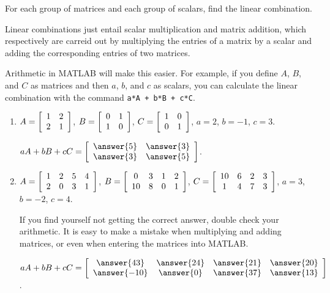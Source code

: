 \documentclass{ximera}
\author{Zack Reed}
\begin{document}
\begin{problem}

  For each group of matrices and each group of scalars, find the linear combination.

  \begin{hint}
  
    Linear combinations just entail scalar multiplication and matrix addition, which respectively are carreid out by multiplying the entries of a matrix by a scalar and adding the corresponding entries of two matrices.
    
    Arithmetic in MATLAB will make this easier. For example, if you define $A$, $B$, and $C$ as matrices and then $a$, $b$, and $c$ as scalars, you can calculate the linear combination with the command \texttt{a*A + b*B + c*C}.

  \end{hint}

  \begin{enumerate}
    \item
      $A = \startmat{cc}
        1 & 2 \\
        2 & 1
      \stopmat$,\quad
      $B = \startmat{cc}
        0 & 1 \\
        1 & 0
      \stopmat$,\quad
      $C = \startmat{cc}
        1 & 0 \\
        0 & 1
      \stopmat$,\quad
      $a = 2$, $b = -1$, $c = 3$.
  
      $aA + bB + cC = \startmat{cc}
        \answer{5} & \answer{3} \\
        \answer{3} & \answer{5}
      \stopmat$.
  
    \item 
      $A = \startmat{cccc}
        1 & 2 & 5 & 4 \\
        2 & 0 & 3 & 1
      \stopmat$,\quad
      $B = \startmat{cccc}
        0 & 3 & 1 & 2 \\
        10 & 8 & 0 & 1
      \stopmat$,\quad
      $C = \startmat{cccc}
        10 & 6 & 2 & 3 \\
        1 & 4 & 7 & 3
      \stopmat$,\quad
      $a = 3$, $b = -2$, $c = 4$.

      \begin{hint}
      
        If you find yourself not getting the correct answer, double check your arithmetic. It is easy to make a mistake when multiplying and adding matrices, or even when entering the matrices into MATLAB.

      \end{hint}
  
      $aA + bB + cC = \startmat{cccc}
        \answer{43} & \answer{24} & \answer{21} & \answer{20} \\
        \answer{-10} & \answer{0} & \answer{37} & \answer{13}
      \stopmat$.
  
    \end{enumerate}
  

\end{problem}
\end{document}
